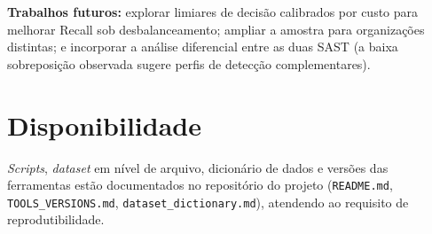 \documentclass[12pt]{article}
\begin{document}
\textbf{Trabalhos futuros:} explorar limiares de decisão calibrados por custo
para melhorar Recall sob desbalanceamento; ampliar a amostra para organizações
distintas; e incorporar a análise diferencial entre as duas SAST (a baixa
sobreposição observada sugere perfis de detecção complementares).

\section*{Disponibilidade}
\textit{Scripts}, \textit{dataset} em nível de arquivo, dicionário de dados e
versões das ferramentas estão documentados no repositório do projeto
(\texttt{README.md}, \texttt{TOOLS\_VERSIONS.md},
\texttt{dataset\_dictionary.md}), atendendo ao requisito de reprodutibilidade.



\end{document}
